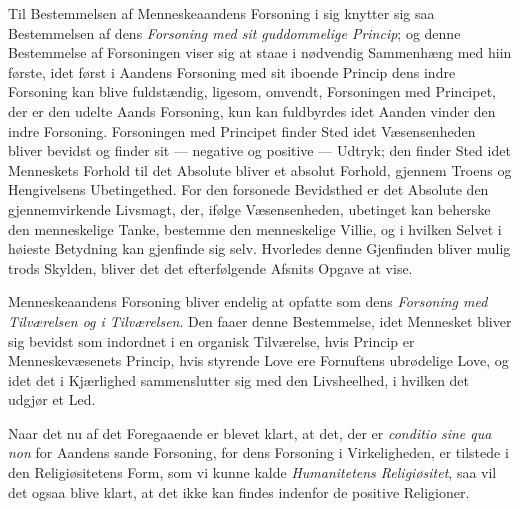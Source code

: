 Til Bestemmelsen af Menneskeaandens Forsoning i sig knytter sig saa Bestemmelsen
af dens \emph{Forsoning med sit
 guddommelige Princip}; og denne Bestemmelse af Forsoningen viser sig at staae i
nødvendig Sammenhæng med hiin første, idet først i Aandens Forsoning med sit
iboende Princip dens indre Forsoning kan blive fuldstændig, ligesom, omvendt,
Forsoningen med Principet, der er den udelte Aands Forsoning, kun kan fuldbyrdes
idet Aanden vinder den indre Forsoning. Forsoningen med Principet finder Sted idet
Væsensenheden bliver bevidst og finder sit --- negative og positive --- Udtryk;
den finder Sted idet Menneskets Forhold til det Absolute bliver et absolut
Forhold, gjennem Troens og Hengivelsens Ubetingethed. For den forsonede Bevidsthed
er det Absolute den gjennemvirkende Livsmagt, der, ifølge Væsensenheden, ubetinget
kan beherske den menneskelige Tanke, bestemme den menneskelige Villie, og i hvilken
Selvet i høieste Betydning kan gjenfinde sig selv. Hvorledes denne Gjenfinden
bliver mulig trods Skylden, bliver det det efterfølgende Afsnits Opgave at vise.

Menneskeaandens Forsoning bliver endelig at opfatte som dens \emph{Forsoning med
Tilværelsen og i Tilværelsen}. Den faaer denne Bestemmelse, idet Mennesket bliver
sig bevidst som indordnet i en organisk Tilværelse, hvis Princip er
Menneskevæsenets Princip, hvis styrende Love ere Fornuftens ubrødelige Love, og
idet det i Kjærlighed sammenslutter sig med den Livsheelhed, i hvilken det udgjør
et Led.

Naar det nu af det Foregaaende er blevet klart, at det, der er \textit{conditio}
\emph{\textit{sine qua non}} for Aandens sande Forsoning, for dens Forsoning i
Virkeligheden, er tilstede i den Religiøsitetens Form, som vi kunne kalde
\emph{Humanitetens Religiøsitet}, saa vil det ogsaa blive klart, at det ikke kan
findes indenfor de positive Religioner.

